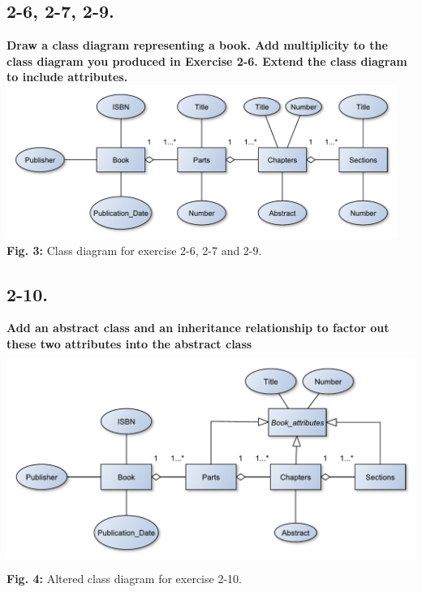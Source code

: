 \documentclass[12pt]{article}
\begin{document}
\newpage
\subsection{2-6, 2-7, 2-9.}
\textbf{Draw a class diagram representing a book. Add multiplicity to the class diagram you produced in Exercise 2-6. Extend the class diagram to include attributes.}\\

\includegraphics[height=50mm]{2-6}\\
\textbf{Fig. 3:} Class diagram for exercise 2-6, 2-7 and 2-9.



\subsection{2-10.}
\textbf{Add an abstract class and an inheritance relationship to factor out these two attributes into the abstract class}\\

\includegraphics[height=70mm]{2-10}\\
\textbf{Fig. 4:} Altered class diagram for exercise 2-10.



\newpage
\end{document}
